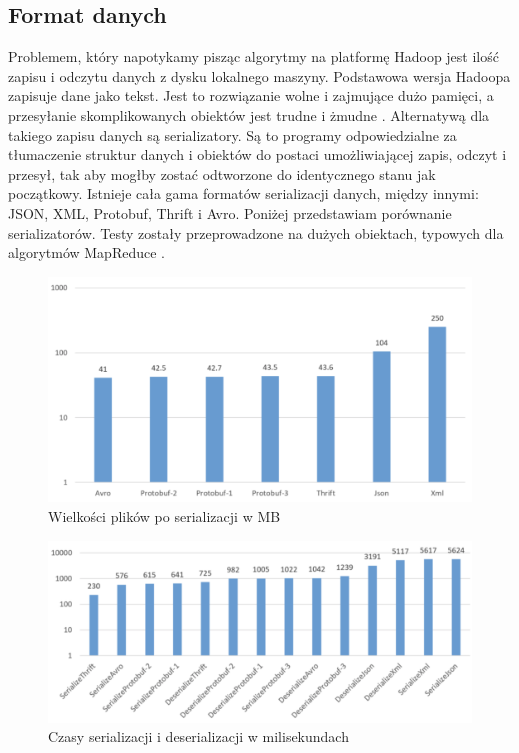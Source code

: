 \documentclass{pracamgr}
\begin{document}
\subsection{Format danych}

Problemem, który napotykamy pisząc algorytmy na platformę Hadoop jest ilość zapisu i odczytu danych z dysku lokalnego maszyny. Podstawowa wersja Hadoopa zapisuje dane jako tekst. Jest to rozwiązanie wolne i zajmujące dużo pamięci, a przesyłanie skomplikowanych obiektów jest trudne i żmudne \cite{shvachko2010hadoop, white2012hadoop}. Alternatywą dla takiego zapisu danych są serializatory. Są to programy odpowiedzialne za tłumaczenie struktur danych i obiektów do postaci umożliwiającej zapis, odczyt i przesył, tak aby mogłby zostać odtworzone do identycznego stanu jak początkowy. Istnieje cała gama formatów serializacji danych, między innymi: JSON, XML, Protobuf, Thrift i Avro. Poniżej przedstawiam porównanie serializatorów. Testy zostały przeprowadzone na dużych obiektach, typowych dla algorytmów MapReduce \cite{serialization, avro}.

\begin{figure}[H]
    \caption{Wielkości plików po serializacji w MB}
    \includegraphics[width=15cm]{serialization_compression.png}
\end{figure}
\begin{figure}[H]
    \caption{Czasy serializacji i deserializacji w milisekundach}
    \includegraphics[width=15cm]{serialization_time.png}
\end{figure}
\end{document}
